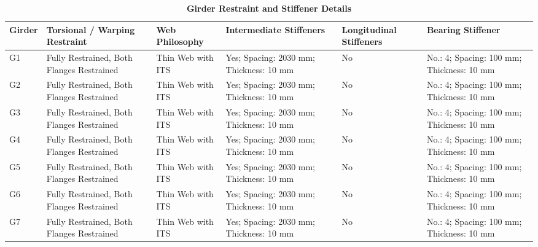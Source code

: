 \documentclass[12pt,a4paper]{report}
\numberwithin{table}{chapter}
\numberwithin{figure}{chapter}
\begin{document}
\vspace{0.6em}

\vspace{4pt}
\begin{longtable}{|L{1.4cm}|p{2.2cm}|p{2.2cm}|p{3.0cm}|p{2.4cm}|p{2.2cm}|}
\caption{\textbf{Girder Restraint and Stiffener Details}}\\
\hline
\textbf{Girder} & \textbf{Torsional / Warping Restraint} & \textbf{Web Philosophy} & \textbf{Intermediate Stiffeners} & \textbf{Longitudinal Stiffeners} & \textbf{Bearing Stiffener} \\[6pt]
\hline
\endfirsthead
\endhead

G1 & Fully Restrained, Both Flanges Restrained & Thin Web with ITS & Yes; Spacing: 2030 mm; Thickness: 10 mm & No & No.: 4; Spacing: 100 mm; Thickness: 10 mm \\[8pt]
\hline
G2 & Fully Restrained, Both Flanges Restrained & Thin Web with ITS & Yes; Spacing: 2030 mm; Thickness: 10 mm & No & No.: 4; Spacing: 100 mm; Thickness: 10 mm \\[8pt]
\hline
G3 & Fully Restrained, Both Flanges Restrained & Thin Web with ITS & Yes; Spacing: 2030 mm; Thickness: 10 mm & No & No.: 4; Spacing: 100 mm; Thickness: 10 mm \\[8pt]
\hline
G4 & Fully Restrained, Both Flanges Restrained & Thin Web with ITS & Yes; Spacing: 2030 mm; Thickness: 10 mm & No & No.: 4; Spacing: 100 mm; Thickness: 10 mm \\[8pt]
\hline
G5 & Fully Restrained, Both Flanges Restrained & Thin Web with ITS & Yes; Spacing: 2030 mm; Thickness: 10 mm & No & No.: 4; Spacing: 100 mm; Thickness: 10 mm \\[8pt]
\hline
G6 & Fully Restrained, Both Flanges Restrained & Thin Web with ITS & Yes; Spacing: 2030 mm; Thickness: 10 mm & No & No.: 4; Spacing: 100 mm; Thickness: 10 mm \\[8pt]
\hline
G7 & Fully Restrained, Both Flanges Restrained & Thin Web with ITS & Yes; Spacing: 2030 mm; Thickness: 10 mm & No & No.: 4; Spacing: 100 mm; Thickness: 10 mm \\[8pt]
\hline
\end{longtable}



\newpage

\vspace{0.4em}
\setlength{\tabcolsep}{4pt}
\setlength\LTleft{0pt}
\setlength\LTright{\fill}
\end{document}
